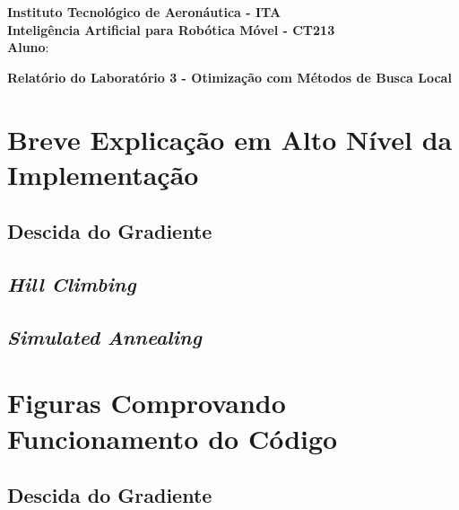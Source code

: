 \documentclass[brazil, 12pt]{article}
\begin{document}
\begin{center}
\textbf{Instituto Tecnológico de Aeronáutica - ITA} \\
\textbf{Inteligência Artificial para Robótica Móvel - CT213} \\
\textbf{Aluno}:     %
\end{center}

\begin{center}
\textbf{Relatório do Laboratório 3 - Otimização com Métodos de Busca Local}
\end{center}
\vspace*{0.5cm}

\section{Breve Explicação em Alto Nível da Implementação}

\subsection{Descida do Gradiente}

\subsection{\emph{Hill Climbing}}

\subsection{\emph{Simulated Annealing}}



\section{Figuras Comprovando Funcionamento do Código}

\subsection{Descida do Gradiente}
\end{document}
